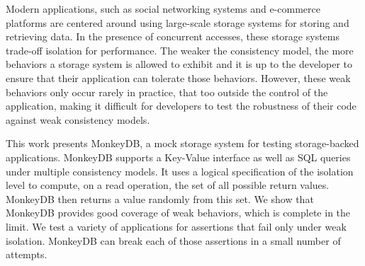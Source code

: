 
Modern applications, such as social networking systems and e-commerce platforms
are centered around using large-scale storage systems for storing and retrieving
data. In the presence of concurrent accesses, these storage systems trade-off isolation
for performance. The weaker the consistency model, the more behaviors a storage
system is allowed to exhibit and it is up to the developer to ensure that their
application can tolerate those behaviors. However, these weak behaviors only
occur rarely in practice, that too outside the control of the application, 
making it difficult for developers to test the robustness of their 
code against weak consistency models. 

This work presents MonkeyDB, a mock storage system for testing storage-backed
applications. MonkeyDB supports a Key-Value interface as well as SQL queries
under multiple consistency models. It uses a logical specification of the isolation
level to compute, on a read operation, the set of all possible return values.
MonkeyDB then returns a value randomly from this set. 
We show that MonkeyDB provides 
good coverage of weak behaviors, which is complete in the limit. We test a
variety of applications for assertions that fail only under weak isolation.
MonkeyDB can break each of those assertions in a small number of attempts. 
